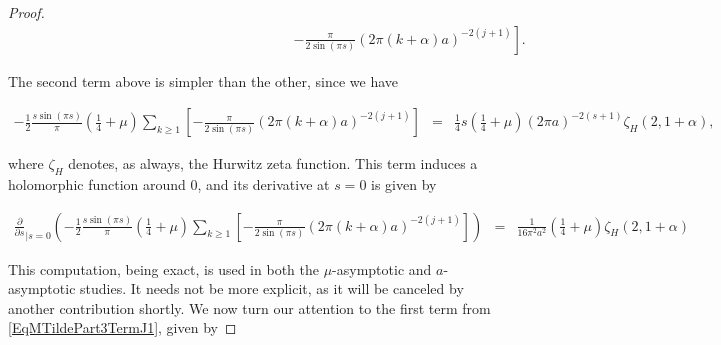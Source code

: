 \documentclass{jams-l}
\theoremstyle{definition}
\theoremstyle{remark}
\numberwithin{equation}{section}
\begin{document}
\begin{proof}
\begin{equation}
\begin{array}{l}
                                \qquad \qquad \qquad \qquad \qquad \qquad \qquad \qquad \qquad \qquad \left. \scriptstyle - \frac{\pi}{2 \sin \left( \pi s \right)} \left( 2 \pi \left( k + \alpha \right) a \right)^{-2 \left( j + 1 \right)} \right].
                            \end{array}
                        \end{equation}
                        
                        \noindent The second term above is simpler than the other, since we have
                        
                        \[ \begin{array}{lll}
                                \scriptstyle - \frac{1}{2} \frac{s \sin \left( \pi s \right)}{\pi} \left( \frac{1}{4} + \mu \right) \sum\limits_{k \geqslant 1} \left[ - \frac{\pi}{2 \sin \left( \pi s \right)} \left( 2 \pi \left( k + \alpha \right) a \right)^{-2 \left( j + 1 \right)} \right] & \scriptstyle = & \scriptstyle \frac{1}{4} s \left( \frac{1}{4} + \mu \right) \left( 2 \pi a \right)^{-2 \left( s+1 \right)} \zeta_H \left( 2, 1 + \alpha \right),
                            \end{array} \]
                        
                        \noindent where $\zeta_H$ denotes, as always, the Hurwitz zeta function. This term induces a holomorphic function around $0$, and its derivative at $s=0$ is given by
                        
                        \[ \begin{array}{lll}
                                \scriptstyle \frac{\partial}{\partial s}_{\left \vert s = 0 \right.} \left( - \frac{1}{2} \frac{s \sin \left( \pi s \right)}{\pi} \left( \frac{1}{4} + \mu \right) \sum\limits_{k \geqslant 1} \left[ - \frac{\pi}{2 \sin \left( \pi s \right)} \left( 2 \pi \left( k + \alpha \right) a \right)^{-2 \left( j + 1 \right)} \right] \right) & \scriptstyle = & \scriptstyle \frac{1}{16 \pi^2 a^2} \left( \frac{1}{4} + \mu \right) \zeta_H \left( 2, 1 + \alpha \right)
                            \end{array} \]
                        
                        \noindent This computation, being exact, is used in both the $\mu$-asymptotic and $a$-asymptotic studies. It needs not be more explicit, as it will be canceled by another contribution shortly. We now turn our attention to the first term from \eqref{EqMTildePart3TermJ1}, given by
                        

\end{proof}
\end{document}
